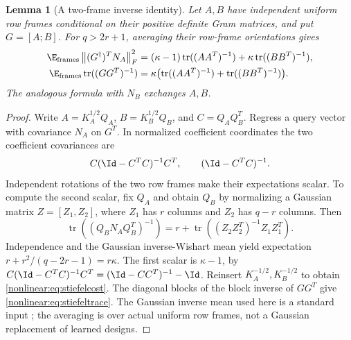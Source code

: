 \documentclass[11pt,oneside,openany,a4paper]{book}
\numberwithin{equation}{chapter}
\newtheorem{lemma}[theorem]{Lemma}
\theoremstyle{definition}
\theoremstyle{remark}
\newcommand{\F}[1]{\left\lVert#1\right\rVert_F}
\DeclareMathOperator{\tr}{tr}\DeclareMathOperator{\rank}{rank}
\begin{document}
\begin{lemma}[A two-frame inverse identity]\label{nonlinear:lem:stiefel}
Let $A,B$ have independent uniform row frames conditional on their positive definite Gram matrices, and put $G=[A;B]$. For $q>2r+1$, averaging their row-frame orientations gives
\begin{align}
 \E_{\rm frames}\F{(G^\dagger)^TN_A}^2
   &=(\kappa-1)\tr((AA^T)^{-1})+\kappa\tr((BB^T)^{-1}),\label{nonlinear:eq:stiefelcost}\\
 \E_{\rm frames}\tr((GG^T)^{-1})
   &=\kappa\bigl(\tr((AA^T)^{-1})+\tr((BB^T)^{-1})\bigr).\label{nonlinear:eq:stiefeltrace}
\end{align}
The analogous formula with $N_B$ exchanges $A,B$.
\end{lemma}
\begin{proof}
Write $A=K_A^{1/2}Q_A$, $B=K_B^{1/2}Q_B$, and $C=Q_AQ_B^T$. Regress a query vector with covariance $N_A$ on $G^T$. In normalized coefficient coordinates the two coefficient covariances are
\[
 C(\Id-C^TC)^{-1}C^T,\qquad (\Id-C^TC)^{-1}.
\]
Independent rotations of the two row frames make their expectations scalar. To compute the second scalar, fix $Q_A$ and obtain $Q_B$ by normalizing a Gaussian matrix $Z=[Z_1,Z_2]$, where $Z_1$ has $r$ columns and $Z_2$ has $q-r$ columns. Then
\[
 \tr((Q_BN_AQ_B^T)^{-1})
 =r+\tr((Z_2Z_2^T)^{-1}Z_1Z_1^T).
\]
Independence and the Gaussian inverse-Wishart mean yield expectation
$r+r^2/(q-2r-1)=r\kappa$. The first scalar is $\kappa-1$, by
$C(\Id-C^TC)^{-1}C^T=(\Id-CC^T)^{-1}-\Id$. Reinsert $K_A^{-1/2},K_B^{-1/2}$ to obtain \eqref{nonlinear:eq:stiefelcost}. The diagonal blocks of the block inverse of $GG^T$ give \eqref{nonlinear:eq:stiefeltrace}. The Gaussian inverse mean used here is a standard input \cite{HMT}; the averaging is over actual uniform row frames, not a Gaussian replacement of learned designs.
\end{proof}
\end{document}

